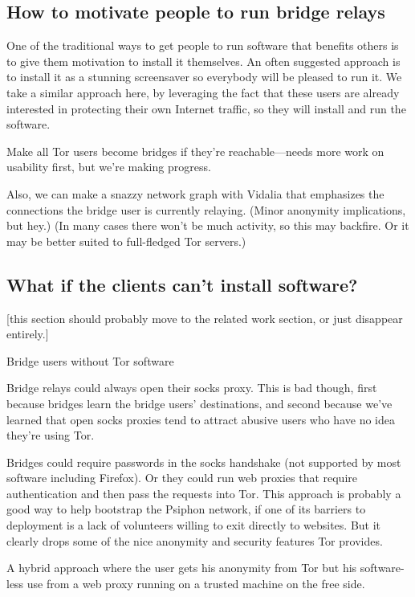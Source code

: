 \documentclass{llncs}
\begin{document}
\subsection{How to motivate people to run bridge relays}

One of the traditional ways to get people to run software that benefits
others is to give them motivation to install it themselves.  An often
suggested approach is to install it as a stunning screensaver so everybody
will be pleased to run it. We take a similar approach here, by leveraging
the fact that these users are already interested in protecting their
own Internet traffic, so they will install and run the software.

Make all Tor users become bridges if they're reachable---needs more work
on usability first, but we're making progress.

Also, we can make a snazzy network graph with Vidalia that emphasizes
the connections the bridge user is currently relaying. (Minor anonymity
implications, but hey.) (In many cases there won't be much activity,
so this may backfire. Or it may be better suited to full-fledged Tor
servers.)

\subsection{What if the clients can't install software?}

[this section should probably move to the related work section,
or just disappear entirely.]

Bridge users without Tor software

Bridge relays could always open their socks proxy. This is bad though,
first
because bridges learn the bridge users' destinations, and second because
we've learned that open socks proxies tend to attract abusive users who
have no idea they're using Tor.

Bridges could require passwords in the socks handshake (not supported
by most software including Firefox). Or they could run web proxies
that require authentication and then pass the requests into Tor. This
approach is probably a good way to help bootstrap the Psiphon network,
if one of its barriers to deployment is a lack of volunteers willing
to exit directly to websites. But it clearly drops some of the nice
anonymity and security features Tor provides.

A hybrid approach where the user gets his anonymity from Tor but his
software-less use from a web proxy running on a trusted machine on the
free side.
\end{document}
